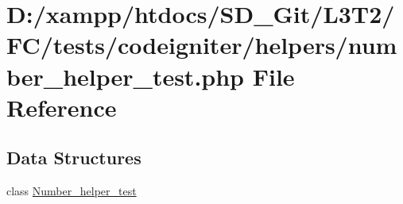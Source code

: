 \hypertarget{tests_2codeigniter_2helpers_2number__helper__test_8php}{}\section{D\+:/xampp/htdocs/\+S\+D\+\_\+\+Git/\+L3\+T2/\+F\+C/tests/codeigniter/helpers/number\+\_\+helper\+\_\+test.php File Reference}
\label{tests_2codeigniter_2helpers_2number__helper__test_8php}
\subsection*{Data Structures}
\begin{DoxyCompactItemize}
\item 
class \hyperlink{class_number__helper__test}{Number\+\_\+helper\+\_\+test}
\end{DoxyCompactItemize}
